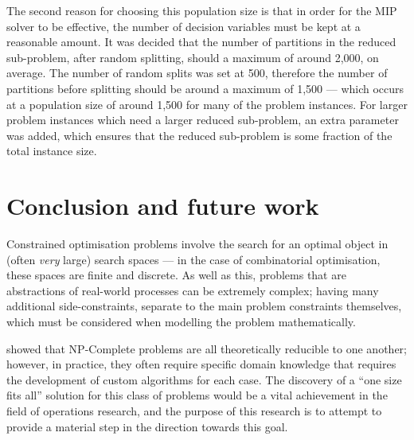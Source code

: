 \documentclass[preprint]{elsarticle}
\begin{document}
%
The second reason for choosing this population size is that in order for the MIP solver to be effective, the number of decision variables must be kept at a reasonable amount. It was decided that the number of partitions in the reduced sub-problem, after random splitting, should a maximum of around 2,000, on average. The number of random splits was set at 500, therefore the number of partitions before splitting should be around a maximum of 1,500 --- which occurs at a population size of around 1,500 for many of the problem instances. For larger problem instances which need a larger reduced sub-problem, an extra parameter was added, which ensures that the reduced sub-problem is some fraction of the total instance size.

\section{Conclusion and future work}

Constrained optimisation problems involve the search for an optimal object in (often \emph{very} large) search spaces --- in the case of combinatorial optimisation, these spaces are finite and discrete. As well as this, problems that are abstractions of real-world processes can be extremely complex; having many additional side-constraints, separate to the main problem constraints themselves, which must be considered when modelling the problem mathematically.

\citet{np:karp} showed that NP-Complete problems are all theoretically reducible to one another; however, in practice, they often require specific domain knowledge that requires the development of custom algorithms for each case. The discovery of a ``one size fits all'' solution for this class of problems would be a vital achievement in the field of operations research, and the purpose of this research is to attempt to provide a material step in the direction towards this goal.
\end{document}
